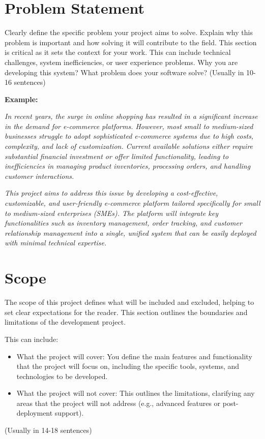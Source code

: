 \section{Problem Statement}
Clearly define the specific problem your project aims to solve. Explain why this problem is important and how solving it will contribute to the field. This section is critical as it sets the context for your work.
This can include technical challenges, system inefficiencies, or user experience problems.
Why you are developing this system?
What problem does your software solve?
(Usually in 10-16 sentences)

\textbf{Example:}

\textit{In recent years, the surge in online shopping has resulted in a significant increase in the demand for e-commerce platforms. However, most small to medium-sized businesses struggle to adopt sophisticated e-commerce systems due to high costs, complexity, and lack of customization. Current available solutions either require substantial financial investment or offer limited functionality, leading to inefficiencies in managing product inventories, processing orders, and handling customer interactions.}

\textit{This project aims to address this issue by developing a cost-effective, customizable, and user-friendly e-commerce platform tailored specifically for small to medium-sized enterprises (SMEs). The platform will integrate key functionalities such as inventory management, order tracking, and customer relationship management into a single, unified system that can be easily deployed with minimal technical expertise.}

\section{Scope}
The scope of this project defines what will be included and excluded, helping to set clear expectations for the reader. This section outlines the boundaries and limitations of the development project.

This can include:
\begin{itemize}
    \item What the project will cover: You define the main features and functionality that the project will focus on, including the specific tools, systems, and technologies to be developed.
    \item What the project will not cover: This outlines the limitations, clarifying any areas that the project will not address (e.g., advanced features or post-deployment support). 

\end{itemize}
(Usually in 14-18 sentences)

